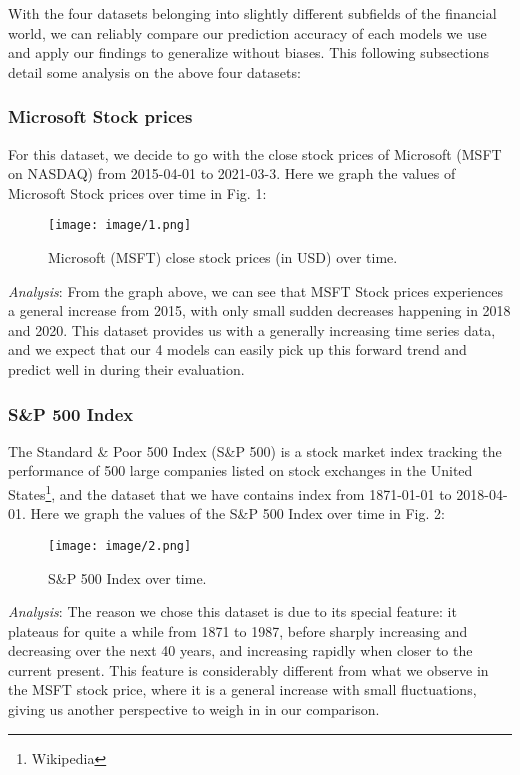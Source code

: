 \documentclass[letterpaper, 10 pt, conference]{ieeeconf}  %
\begin{document}
        With the four datasets belonging into slightly different subfields of the financial world, we can reliably compare our prediction accuracy of each models we use and apply our findings to generalize without biases. This following subsections detail some analysis on the above four datasets:

        \subsubsection{Microsoft Stock prices} For this dataset, we decide to go with the close stock prices of Microsoft (MSFT on NASDAQ) from 2015-04-01 to 2021-03-3. Here we graph the values of Microsoft Stock prices over time in Fig. 1:
        \begin{figure}[thpb]
            \centering
            \texttt{[image: image/1.png]}
            \caption{Microsoft (MSFT) close stock prices (in USD) over time.}
            \label{figurelabel}
        \end{figure}
        
        \textit{Analysis}: From the graph above, we can see that MSFT Stock prices experiences a general increase from 2015, with only small sudden decreases happening in 2018 and 2020. This dataset provides us with a generally increasing time series data, and we expect that our 4 models can easily pick up this forward trend and predict well in during their evaluation. 

        \subsubsection{S\&P 500 Index} The Standard \& Poor 500 Index (S\&P 500) is a stock market index tracking the performance of 500 large companies listed on stock exchanges in the United States\footnote{Wikipedia}, and the dataset that we have contains index from 1871-01-01 to 2018-04-01. Here we graph the values of the S\&P 500 Index over time in Fig. 2:

        \begin{figure}[thpb]
            \centering
            \texttt{[image: image/2.png]}
            \caption{S\&P 500 Index over time.}
            \label{figurelabel}
        \end{figure}

        \textit{Analysis}: The reason we chose this dataset is due to its special feature: it plateaus for quite a while from 1871 to 1987, before sharply increasing and decreasing over the next 40 years, and increasing rapidly when closer to the current present. This feature is considerably different from what we observe in the MSFT stock price, where it is a general increase with small fluctuations, giving us another perspective to weigh in in our comparison.
\end{document}
